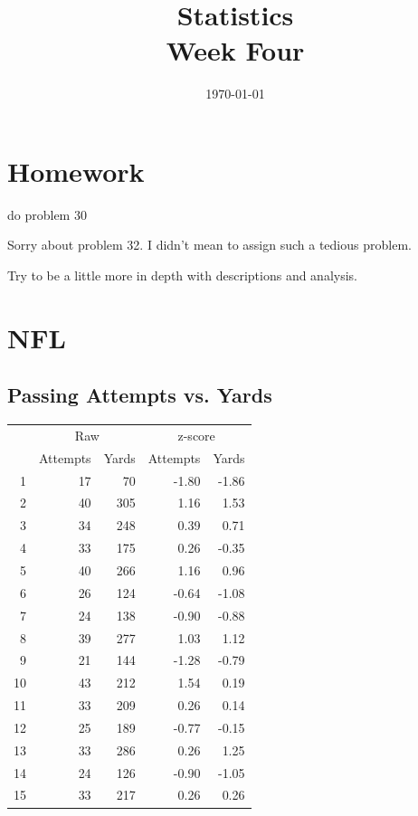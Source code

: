\documentclass{exam}
\author{}
\title{Statistics \\ Week Four}
\date{\today}
\begin{document}
\maketitle
\tableofcontents

  \section{Homework}

  \begin{itemize*}
    \item do problem 30
    \item Sorry about problem 32. I didn't mean to assign such a tedious problem.  
    \item Try to be a little more in depth with descriptions and analysis.
  \end{itemize*}

  \section{NFL}

  \subsection{Passing Attempts vs. Yards}

  \begin{table}[H]
    \centering
      \begin{tabular}{rrrrr}
        \toprule
           & \multicolumn{2}{c}{Raw} & \multicolumn{2}{c}{z-score } \\
        \cmidrule(r){2-3} \cmidrule(r){4-5} 
           & Attempts & Yards & Attempts & Yards \\
        \midrule
        1  & 17       & 70    & -1.80    & -1.86 \\
        2  & 40       & 305   & 1.16     & 1.53 \\
        3  & 34       & 248   & 0.39     & 0.71 \\
        4  & 33       & 175   & 0.26     & -0.35 \\
        5  & 40       & 266   & 1.16     & 0.96 \\
        6  & 26       & 124   & -0.64    & -1.08 \\
        7  & 24       & 138   & -0.90    & -0.88 \\
        8  & 39       & 277   & 1.03     & 1.12 \\
        9  & 21       & 144   & -1.28    & -0.79 \\
        10 & 43       & 212   & 1.54     & 0.19 \\
        11 & 33       & 209   & 0.26     & 0.14 \\
        12 & 25       & 189   & -0.77    & -0.15 \\
        13 & 33       & 286   & 0.26     & 1.25 \\
        14 & 24       & 126   & -0.90    & -1.05 \\
        15 & 33       & 217   & 0.26     & 0.26 \\
        \bottomrule
      \end{tabular}
  \end{table}
\end{document}
